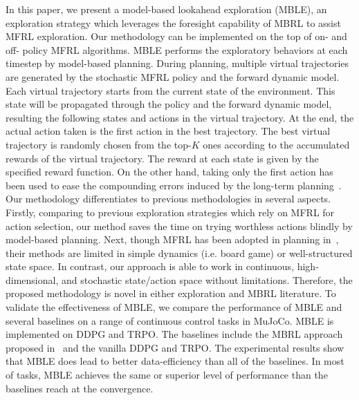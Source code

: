 \documentclass{article} %
\begin{document}
In this paper, we present a model-based lookahead  exploration (MBLE), an exploration strategy which leverages the foresight capability of MBRL to assist MFRL exploration. Our methodology can be implemented on the top of on- and off- policy MFRL algorithms. MBLE performs the exploratory behaviors at each timestep by model-based planning. During planning, multiple virtual trajectories are generated by the stochastic MFRL policy and the forward dynamic model. Each virtual trajectory starts from the current state of the environment. This state will be propagated through the policy and the forward dynamic model, resulting the following states and actions in the virtual trajectory. At the end, the actual action taken is the first action in the best trajectory. The best virtual trajectory is randomly chosen from the top-$K$ ones according to the accumulated rewards of the virtual trajectory. The reward at each state is given by the specified reward function. On the other hand, taking only the first action has been used to ease the compounding errors induced by the long-term planning~\cite{nagabandi2017neural}.
Our methodology differentiates to previous methodologies in several aspects. Firstly, comparing to previous exploration strategies which rely on MFRL for action selection, our method saves the time on trying worthless actions blindly by model-based planning. Next, though MFRL has been adopted in planning in~\cite{silver2016mastering,tamar2016value}, their methods are limited in simple dynamics (i.e. board game) or well-structured state space. In contrast, our approach is able to work in continuous, high-dimensional, and stochastic state/action space without limitations. Therefore, the proposed methodology is novel in either exploration and MBRL literature.
To validate the effectiveness of MBLE, we compare the performance of MBLE and several baselines on a range of continuous control tasks in MuJoCo. MBLE is implemented on DDPG and TRPO. The baselines include the MBRL approach proposed in~\cite{nagabandi2017neural} and the vanilla DDPG and TRPO. The experimental results show that MBLE does lead to better data-efficiency than all of the baselines. In most of tasks, MBLE achieves the same or superior level of performance than the baselines reach at the convergence. 
\end{document}
